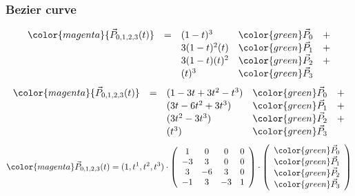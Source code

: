 \begin{frame}
\frametitle{Bezier curve}
  {\tiny
  \[
  \begin{array}{lclrc}
    \color{magenta}{\vec{P}_{0,1,2,3}(t)} &=& (1-t)^3&{\color{green}\vec{P}_0} &+ \\
                                       & & 3(1-t)^2(t)&{\color{green}\vec{P}_1} &+ \\
                                       & & 3(1-t)(t)^2&{\color{green}\vec{P}_2} &+ \\
                                       & & (t)^3&{\color{green}\vec{P}_3} &
  \end{array}
  \]
  }
  {\tiny
  \[
  \begin{array}{lclrc}
    \color{magenta}{\vec{P}_{0,1,2,3}(t)} &=& (1-3t+3t^2-t^3)&{\color{green}\vec{P}_0} &+ \\
                                       & & (3t-6t^2+3t^3)&{\color{green}\vec{P}_1} &+ \\
                                       & & (3t^2-3t^3)&{\color{green}\vec{P}_2} &+ \\
                                       & & (t^3)&{\color{green}\vec{P}_3} &
  \end{array}
  \]
  }
  {\tiny
$$
{\color{magenta}\vec{P}_{0,1,2,3}(t)}=(1,t^1,t^2,t^3)\cdot
\left(
\begin{array}{cccc}
 1 &  0 &  0 &  0 \\
-3 &  3 &  0 &  0 \\
 3 & -6 &  3 &  0 \\
-1 &  3 & -3 &  1
\end{array}
\right)
\cdot
\left(
\begin{array}{c}
  {\color{green}\vec{P}_{0}} \\
  {\color{green}\vec{P}_{1}} \\
  {\color{green}\vec{P}_{2}} \\
  {\color{green}\vec{P}_{3}} 
\end{array}
\right)
$$
  }
\end{frame}

